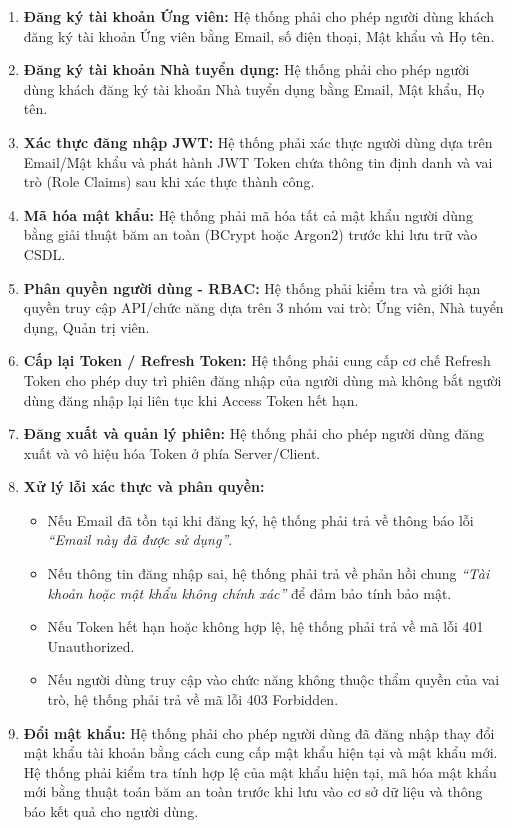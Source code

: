 \begin{enumerate}[label=\bfseries REQ-AUTH-\arabic*:, labelwidth=!, labelsep=0.5em, leftmargin=3.5cm]
    \item \textbf{Đăng ký tài khoản Ứng viên:} Hệ thống phải cho phép người dùng khách đăng ký tài khoản Ứng viên bằng Email, số điện thoại, Mật khẩu và Họ tên.
    \item \textbf{Đăng ký tài khoản Nhà tuyển dụng:} Hệ thống phải cho phép người dùng khách đăng ký tài khoản Nhà tuyển dụng bằng Email, Mật khẩu, Họ tên.
    \item \textbf{Xác thực đăng nhập JWT:} Hệ thống phải xác thực người dùng dựa trên Email/Mật khẩu và phát hành JWT Token chứa thông tin định danh và vai trò (Role Claims) sau khi xác thực thành công.
    \item \textbf{Mã hóa mật khẩu:} Hệ thống phải mã hóa tất cả mật khẩu người dùng bằng giải thuật băm an toàn (BCrypt hoặc Argon2) trước khi lưu trữ vào CSDL.
    \item \textbf{Phân quyền người dùng - RBAC:} Hệ thống phải kiểm tra và giới hạn quyền truy cập API/chức năng dựa trên 3 nhóm vai trò: Ứng viên, Nhà tuyển dụng, Quản trị viên.
    \item \textbf{Cấp lại Token / Refresh Token:} Hệ thống phải cung cấp cơ chế Refresh Token cho phép duy trì phiên đăng nhập của người dùng mà không bắt người dùng đăng nhập lại liên tục khi Access Token hết hạn.
    \item \textbf{Đăng xuất và quản lý phiên:} Hệ thống phải cho phép người dùng đăng xuất và vô hiệu hóa Token ở phía Server/Client.
    \item \textbf{Xử lý lỗi xác thực và phân quyền:}
    \begin{itemize}
        \item Nếu Email đã tồn tại khi đăng ký, hệ thống phải trả về thông báo lỗi \textit{\textquotedblleft Email này đã được sử dụng\textquotedblright}.
        \item Nếu thông tin đăng nhập sai, hệ thống phải trả về phản hồi chung \textit{\textquotedblleft Tài khoản hoặc mật khẩu không chính xác\textquotedblright} để đảm bảo tính bảo mật.
        \item Nếu Token hết hạn hoặc không hợp lệ, hệ thống phải trả về mã lỗi 401 Unauthorized.
        \item Nếu người dùng truy cập vào chức năng không thuộc thẩm quyền của vai trò, hệ thống phải trả về mã lỗi 403 Forbidden.
    \end{itemize}
    \item \textbf{Đổi mật khẩu:} Hệ thống phải cho phép người dùng đã đăng nhập thay đổi mật khẩu tài khoản bằng cách cung cấp mật khẩu hiện tại và mật khẩu mới. Hệ thống phải kiểm tra tính hợp lệ của mật khẩu hiện tại, mã hóa mật khẩu mới bằng thuật toán băm an toàn trước khi lưu vào cơ sở dữ liệu và thông báo kết quả cho người dùng.

\end{enumerate}
